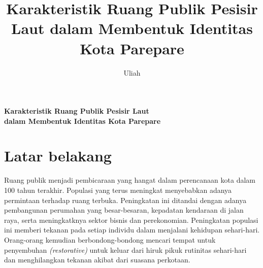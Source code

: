 \documentclass[12pt]{simart} %
\title{
\textbf{Karakteristik Ruang Publik Pesisir Laut dalam Membentuk Identitas Kota Parepare}\\
} %
\author{Uliah}
\begin{document}
\begin{center}
\textbf{Karakteristik Ruang Publik Pesisir Laut\\ dalam Membentuk Identitas Kota Parepare}\\
\end{center}



\begin{comment}

\begin{abstract}
Lorem ipsum dolor sit amet, consectetur adipiscing elit.

\end{abstract}

\hspace*{3.6mm}\textit{Keywords:} Lorem, Ipsum %

\vspace{30pt} %

\end{comment}

\section{Latar belakang}

Ruang publik menjadi pembicaraan yang hangat dalam perencanaan kota dalam 100 tahun terakhir. Populasi yang terus meningkat menyebabkan adanya permintaan terhadap ruang terbuka.
Peningkatan ini ditandai dengan adanya pembangunan perumahan yang besar-besaran, kepadatan kendaraan di jalan raya, serta meningkatknya sektor bisnis dan perekonomian. Peningkatan populasi ini memberi tekanan pada setiap individu dalam menjalani kehidupan sehari-hari.
Orang-orang kemudian berbondong-bondong mencari tempat untuk penyembuhan \textit{(restorative)} untuk keluar dari hiruk pikuk rutinitas sehari-hari dan menghilangkan tekanan akibat dari suasana perkotaan.
\end{document}
